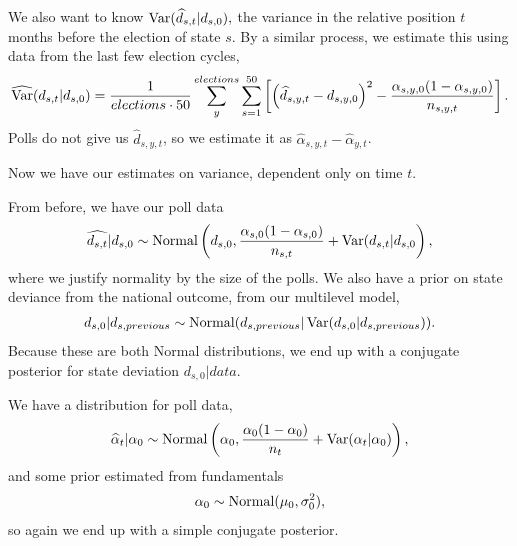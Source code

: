 \documentclass[thesis.tex]{subfiles}
\begin{document}
We also want to know \(\operatorname{Var}(\widehat{d}_{s, t} | d_{s, 0}),\) the variance in the relative position \(t\) months before the election of state \(s\). By a similar process, we estimate this using data from the last few election cycles, \begin{equation}\begin{aligned}
	\widehat{\operatorname{Var}}(d_{s, t} | d_{s, 0}) = \frac{1}{elections \cdot 50} \sum_{y}^{elections} \sum_{s=1}^{50} \left[ \left( \widehat{d}_{s, y, t} - d_{s, y, 0}\right)^2 - \frac{\alpha_{s, y, 0} (1 - \alpha_{s, y, 0})}{n_{s, y, t}} \right].
\end{aligned}\end{equation} Polls do not give us \(\widehat{d}_{s, y, t}\), so we  estimate it as \(\widehat{\alpha}_{s, y, t} - \widehat{\alpha}_{y, t}\). 

Now we have our estimates on variance, dependent only on time \(t\).

From before, we have our poll data \begin{equation}\begin{aligned}
\widehat{d_{s, t}} | d_{s, 0} \sim \operatorname{Normal}\left(d_{s, 0}, \frac{\alpha_{s, 0} (1 - \alpha_{s, 0})}{n_{s, t}} + \operatorname{Var}(d_{s, t} | d_{s, 0}\right),
\end{aligned}\end{equation} where we justify normality by the size of the polls. We also have a prior on state deviance from the national outcome, from our multilevel model, \begin{equation}\begin{aligned}
d_{s, 0} | d_{s, previous} \sim \operatorname{Normal}(d_{s, previous} | \operatorname{Var}(d_{s, 0} | d_{s, previous})).
\end{aligned}\end{equation} Because these are both Normal distributions, we end up with a conjugate posterior for state deviation \(d_{s, 0} | data\).

We have a distribution for poll data, \begin{equation}\begin{aligned}
\widehat{\alpha}_t | \alpha_0 \sim \operatorname{Normal}\left( \alpha_0, \frac{\alpha_0 (1 - \alpha_0)}{n_t} + \operatorname{Var}(\alpha_t | \alpha_0) \right),
\end{aligned}\end{equation} and some prior estimated from fundamentals \begin{equation}\begin{aligned}
	\alpha_0 \sim \operatorname{Normal}(\mu_0, \sigma_0^2),
\end{aligned}\end{equation} so again we end up with a simple conjugate posterior.
\end{document}
